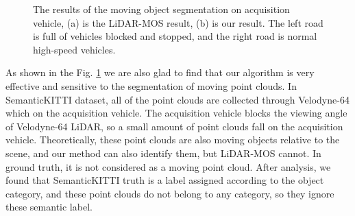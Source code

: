 \documentclass[lettersize,journal]{IEEEtran}
\begin{document}
\begin{figure}[h]
\begin{center}

\caption{The results of the moving object segmentation on acquisition vehicle, (a) is the LiDAR-MOS result, (b) is our result. The left road is full of vehicles blocked and stopped, and the right road is normal high-speed vehicles.}
\label{fig8}
\end{center}
\end{figure}



As shown in the Fig. \ref{fig8} we are also glad to find that our algorithm is very effective and sensitive to the segmentation of moving point clouds. In SemanticKITTI dataset, all of the point clouds are collected through Velodyne-64 which on the acquisition vehicle. The acquisition vehicle blocks the viewing angle of Velodyne-64 LiDAR, so a small amount of point clouds fall on the acquisition vehicle. Theoretically, these point clouds are also moving objects relative to the scene, and our method can also identify them, but LiDAR-MOS cannot. In ground truth, it is not considered as a moving point cloud. After analysis, we found that SemanticKITTI truth is a label assigned according to the object category, and these point clouds do not belong to any category, so they ignore these semantic label. 
\end{document}
